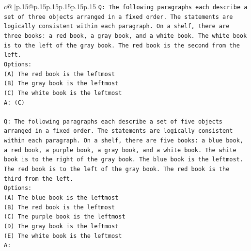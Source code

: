 \documentclass{article}
\begin{document}
{\begin{supertabular}{c@{$\;$}|p{.15\linewidth}@{}p{.15\linewidth}p{.15\linewidth}p{.15\linewidth}p{.15\linewidth}p{.15\linewidth}}
{{{\texttt{Q: The following paragraphs each describe a set of three objects arranged in a fixed order. The statements are logically consistent within each paragraph. On a shelf, there are three books: a red book, a gray book, and a white book. The white book is to the left of the gray book. The red book is the second from the left.} \\
\texttt{Options:} \\
\texttt{(A) The red book is the leftmost} \\
\texttt{(B) The gray book is the leftmost} \\
\texttt{(C) The white book is the leftmost} \\
\texttt{A: (C)} \\
\\ 
\texttt{Q: The following paragraphs each describe a set of five objects arranged in a fixed order. The statements are logically consistent within each paragraph. On a shelf, there are five books: a blue book, a red book, a purple book, a gray book, and a white book. The white book is to the right of the gray book. The blue book is the leftmost. The red book is to the left of the gray book. The red book is the third from the left.} \\
\texttt{Options:} \\
\texttt{(A) The blue book is the leftmost} \\
\texttt{(B) The red book is the leftmost} \\
\texttt{(C) The purple book is the leftmost} \\
\texttt{(D) The gray book is the leftmost} \\
\texttt{(E) The white book is the leftmost} \\
\texttt{A:} \\
            }
        }
    }
     \\ \\


\end{supertabular}}
\end{document}
